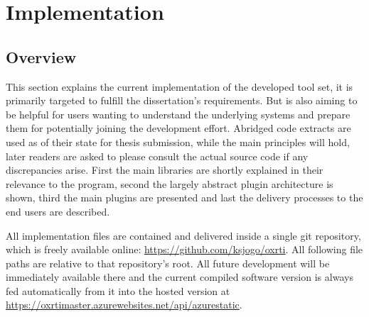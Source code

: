 \section{Implementation}

\subsection{Overview}
This section explains the current implementation of the developed tool set, it
is primarily targeted to fulfill the dissertation's requirements. But is also
aiming to be helpful for users wanting to understand the underlying systems and
prepare them for potentially joining the development effort. Abridged code
extracts are used as of their state for thesis submission, while the main
principles will hold, later readers are asked to please consult the actual
source code if any discrepancies arise. First the main libraries are shortly
explained in their relevance to the program, second the largely abstract plugin
architecture is shown, third the main plugins are presented and last the
delivery processes to the end users are described.


All implementation files are contained and delivered inside a single git
repository, which is freely available online:
\url{https://github.com/ksjogo/oxrti}. All following file paths are relative to that repository's root. All future development will
be immediately available there and the current compiled software version is
always fed automatically from it into the hosted version at \url{https://oxrtimaster.azurewebsites.net/api/azurestatic}.

